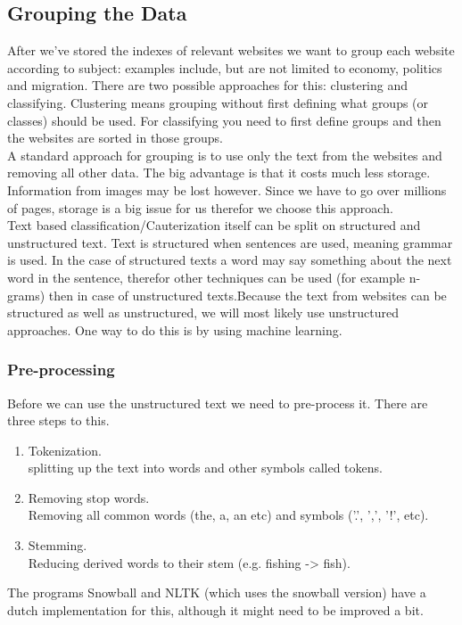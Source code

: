 \subsection{Grouping the Data}
After we've stored the indexes of relevant websites we want to group each website according to subject: examples include, but are not limited to economy, politics and migration. There are two possible approaches for this: clustering and classifying. Clustering means grouping without first defining what groups (or classes) should be used. For classifying you need to first define groups and then the websites are sorted in those groups. \\
A standard approach for grouping is to use only the text from the websites and removing all other data. The big advantage is that it costs much less storage. Information from images may be lost however. Since we have to go over millions of pages, storage is a big issue for us therefor we choose this approach. \\
Text based classification/Cauterization itself can be split on structured and unstructured text. Text is structured when sentences are used, meaning grammar is used. In the case of structured texts a word may say something about the next word in the sentence, therefor other techniques can be used (for example n-grams) then in case of unstructured texts.Because the text from websites can be structured as well as unstructured, we will most likely use unstructured approaches. One way to do this is by using machine learning.

\subsubsection{Pre-processing}
Before we can use the unstructured text we need to pre-process it. There are three steps to this. 
\begin{enumerate}
\item Tokenization. \\ splitting up the text into words and other symbols called tokens.
\item Removing stop words. \\ Removing all common words (the, a, an etc) and symbols ('.', ',', '!', etc). 
\item Stemming. \\ Reducing derived words to their stem (e.g. fishing -> fish).
\end{enumerate}
The programs Snowball \cite{snowball_dutch} and NLTK \cite{nlkt_stemming} (which uses the snowball version) have a dutch implementation for this, although it might need to be improved a bit.

